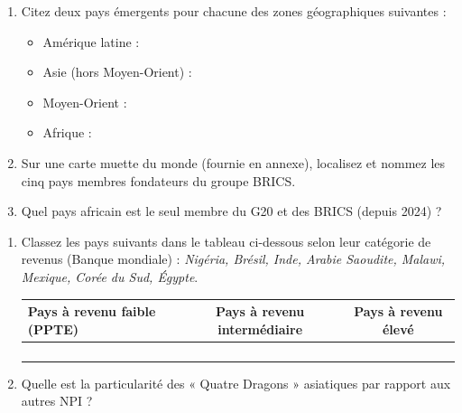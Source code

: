 \documentclass[11pt]{article}
\begin{document}
\begin{exercice}
\begin{enumerate}
    \item Citez deux pays émergents pour chacune des zones géographiques suivantes :
    \begin{itemize}
        \item Amérique latine : \underline{\hspace{6cm}}
        \item Asie (hors Moyen-Orient) : \underline{\hspace{6cm}}
        \item Moyen-Orient : \underline{\hspace{6cm}}
        \item Afrique : \underline{\hspace{6cm}}
    \end{itemize}
    \item Sur une carte muette du monde (fournie en annexe), localisez et nommez les cinq pays membres fondateurs du groupe BRICS.
    \item Quel pays africain est le seul membre du G20 et des BRICS (depuis 2024) ? \underline{\hspace{4cm}}
\end{enumerate}
\end{exercice}

\begin{exercice}
\begin{enumerate}
    \item Classez les pays suivants dans le tableau ci-dessous selon leur catégorie de revenus (Banque mondiale) : \textit{Nigéria, Brésil, Inde, Arabie Saoudite, Malawi, Mexique, Corée du Sud, Égypte}.
    \begin{center}
    \begin{tabular}{|l|c|c|}
    \hline
    \textbf{Pays à revenu faible (PPTE)} & \textbf{Pays à revenu intermédiaire} & \textbf{Pays à revenu élevé} \\
    \hline
     &  &  \\
    \hline
     &  &  \\
    \hline
     &  &  \\
    \hline
     &  &  \\
    \hline
    \end{tabular}
    \end{center}
    \item Quelle est la particularité des « Quatre Dragons » asiatiques par rapport aux autres NPI ? \underline{\hspace{7cm}}
\end{enumerate}
\end{exercice}
\end{document}
